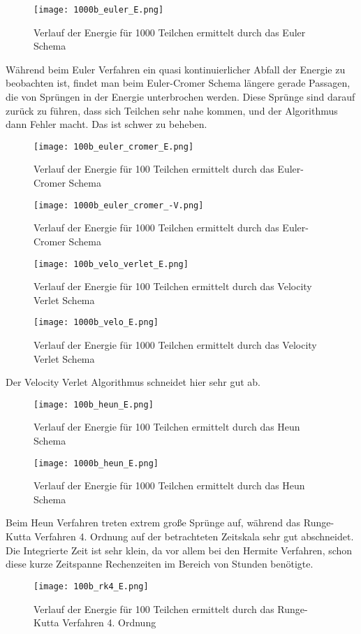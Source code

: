 \documentclass[12pt]{article}
\begin{document}
\begin{figure}[H]\centering\texttt{[image: 1000b\_euler\_E.png]}\caption{Verlauf der Energie für 1000 Teilchen ermittelt durch das Euler Schema}\end{figure}
Während beim Euler Verfahren ein quasi kontinuierlicher Abfall der Energie zu beobachten ist, findet man beim Euler-Cromer Schema längere gerade Passagen, die von Sprüngen in der Energie unterbrochen werden. Diese Sprünge sind darauf zurück zu führen, dass sich Teilchen sehr nahe kommen, und der Algorithmus dann Fehler macht. Das ist schwer zu beheben.
\begin{figure}[H]\centering\texttt{[image: 100b\_euler\_cromer\_E.png]}\caption{Verlauf der Energie für 100 Teilchen ermittelt durch das Euler-Cromer Schema}\end{figure}

\begin{figure}[H]\centering\texttt{[image: 1000b\_euler\_cromer\_-V.png]}\caption{Verlauf der Energie für 1000 Teilchen ermittelt durch das Euler-Cromer Schema}\end{figure}

\begin{figure}[H]\centering\texttt{[image: 100b\_velo\_verlet\_E.png]}\caption{Verlauf der Energie für 100 Teilchen ermittelt durch das Velocity Verlet Schema}\end{figure}

\begin{figure}[H]\centering\texttt{[image: 1000b\_velo\_E.png]}\caption{Verlauf der Energie für 1000 Teilchen ermittelt durch das Velocity Verlet Schema}\end{figure}
Der Velocity Verlet Algorithmus schneidet hier sehr gut ab.
\begin{figure}[H]\centering\texttt{[image: 100b\_heun\_E.png]}\caption{Verlauf der Energie für 100 Teilchen ermittelt durch das Heun Schema}\end{figure}

\begin{figure}[H]\centering\texttt{[image: 1000b\_heun\_E.png]}\caption{Verlauf der Energie für 1000 Teilchen ermittelt durch das Heun Schema}\end{figure}
Beim Heun Verfahren treten extrem große Sprünge auf, während das Runge-Kutta Verfahren 4. Ordnung auf der betrachteten Zeitskala sehr gut abschneidet. Die Integrierte Zeit ist sehr klein, da vor allem bei den Hermite Verfahren, schon diese kurze Zeitspanne Rechenzeiten im Bereich von Stunden benötigte.
\begin{figure}[H]\centering\texttt{[image: 100b\_rk4\_E.png]}\caption{Verlauf der Energie für 100 Teilchen ermittelt durch das Runge-Kutta Verfahren 4. Ordnung}\end{figure}
\end{document}
